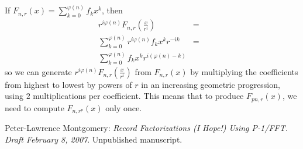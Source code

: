\documentclass{article}
\begin{document}
If $F_{n,r}(x) = \sum_{k=0}^{\varphi(n)} f_k x^k$, then 
\begin{eqnarray*}
r^{i\varphi(n)} F_{n,r}\left(\frac{x}{r^i}\right) & = &\\
\sum_{k=0}^{\varphi(n)} r^{i\varphi(n)} f_k x^k r^{-ik} & = & \\
\sum_{k=0}^{\varphi(n)} f_k x^k r^{i(\varphi(n)-k)} &&
\end{eqnarray*}
so we can generate $r^{i\varphi(n)} F_{n,r}\left(\frac{x}{r^i}\right)$ from 
$F_{n,r}(x)$ by multiplying the coefficients from highest to lowest by powers 
of $r$ in an increasing geometric progression, using $2$ multiplications 
per coefficient. This means that to produce $F_{pn,r}(x)$, we need to compute 
$F_{n,r^p}(x)$ only once.

\begin{thebibliography}{}
 Peter-Lawrence Montgomery: 
{\it Record Factorizations (I Hope!) Using P-1/FFT. Draft February 8, 2007}. 
Unpublished manuscript.
\end{thebibliography}
\end{document}
